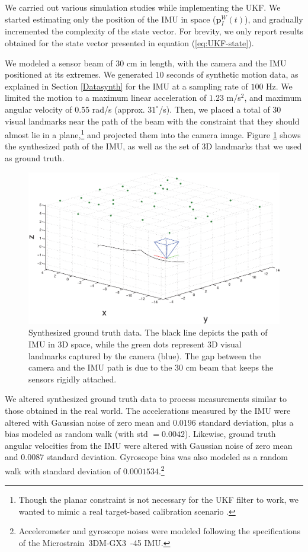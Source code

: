 \documentclass[letterpaper]{article}
\newcommand{\bb}[1]{\mathbf{#1}}
\begin{document}

We carried out various simulation studies while implementing the
UKF. We started estimating only the position of the IMU in space
($\bb{p}_I^W(t)$), and gradually incremented the complexity of the
state vector. For brevity, we only report results obtained for the
state vector presented in equation (\ref{eq:UKF-state}).

We modeled a sensor beam of $30$ cm in length, with the camera and the
IMU positioned at its extremes. We generated $10$ seconds of synthetic
motion data, as explained
in Section \ref{Datasynth} for the IMU at a sampling rate of $100$ Hz. We limited the motion to a maximum
linear acceleration of $1.23$ m/s$^2$, and maximum angular velocity of
$0.55$ rad/s (approx. $31^\circ$/s).  Then, we placed a total of 30
visual landmarks near the path of the beam with the constraint that
they should almost lie in a plane,\footnote{Though the planar
  constraint is not necessary for the UKF filter to work, we wanted to
  mimic a real target-based calibration scenario
  \cite{2011:kelly:article}.} and projected them into the camera
image.  Figure \ref{fig:groundtruth} shows the synthesized path of the
IMU, as well as the set of 3D landmarks that we used as ground truth.
\begin{figure}[h!p]
\centering
\includegraphics[width=.7\linewidth]{groundTruth.eps}
\vspace{-0.5em}
\caption{Synthesized ground truth data. The black line depicts the
  path of IMU in 3D space, while the green dots represent 3D visual
  landmarks captured by the camera (blue). The gap between the camera
  and the IMU path is due to the $30$ cm beam that keeps the sensors
  rigidly attached.}
\label{fig:groundtruth}
\end{figure}

We altered synthesized ground truth data to process measurements
similar to those obtained in the real world. The accelerations
measured by the IMU were altered with Gaussian noise of zero mean and
$0.0196$ standard deviation, plus a bias modeled as random walk (with
std $= 0.0042$). Likewise, ground truth angular velocities from the
IMU were altered with Gaussian noise of zero mean and $0.0087$
standard deviation. Gyroscope bias was also modeled as a random walk
with standard deviation of $0.0001534$.\footnote{Accelerometer and
  gyroscope noises were modeled following the specifications of the
  Microstrain\textregistered\ 3DM-GX3\textregistered\ -45 IMU.}
\end{document}

